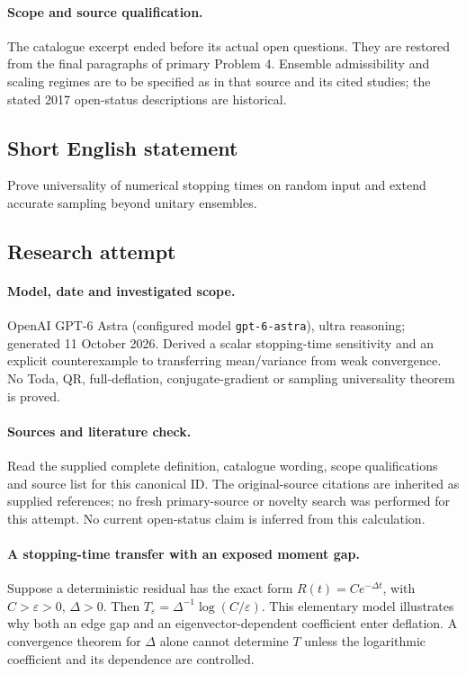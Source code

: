 \documentclass[11pt]{article}
\begin{document}
\paragraph{Scope and source qualification.}The catalogue excerpt ended before its actual open questions. They are restored from the final paragraphs of primary Problem 4. Ensemble admissibility and scaling regimes are to be specified as in that source and its cited studies; the stated 2017 open-status descriptions are historical.
\subsection{Short English statement}
Prove universality of numerical stopping times on random input and extend accurate sampling beyond unitary ensembles.
\subsection{Research attempt}
\paragraph{Model, date and investigated scope.}
OpenAI GPT-6 Astra (configured model \texttt{gpt-6-astra}), ultra reasoning; generated 11 October 2026. Derived a scalar stopping-time sensitivity and an explicit counterexample to transferring mean/variance from weak convergence. No Toda, QR, full-deflation, conjugate-gradient or sampling universality theorem is proved.

\paragraph{Sources and literature check.}
Read the supplied complete definition, catalogue wording, scope qualifications and source list for this canonical ID. The original-source citations are inherited as supplied references; no fresh primary-source or novelty search was performed for this attempt. No current open-status claim is inferred from this calculation.

\paragraph{A stopping-time transfer with an exposed moment gap.}Suppose a deterministic residual has the exact form \(R(t)=Ce^{-\Delta t}\), with \(C>\varepsilon>0\), \(\Delta>0\). Then \(T_\varepsilon=\Delta^{-1}\log(C/\varepsilon)\). This elementary model illustrates why both an edge gap and an eigenvector-dependent coefficient enter deflation. A convergence theorem for \(\Delta\) alone cannot determine \(T\) unless the logarithmic coefficient and its dependence are controlled.
\end{document}
